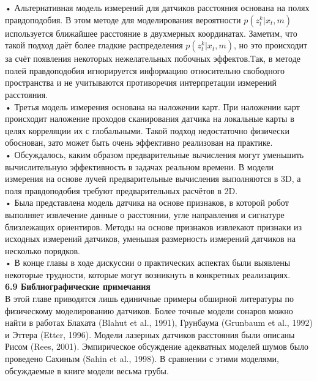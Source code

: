 \documentclass[10pt,a4paper]{article}
\begin{document}
• Альтернативная модель измерений для датчиков расстояния основана на полях правдоподобия. В этом методе для моделирования вероятности $p(z_t^k | x_t, m)$ используется ближайшее расстояние в двухмерных координатах. Заметим, что такой подход даёт более гладкие распределения $p(z_t^k | x_t, m)$, но это происходит за счёт появления некоторых нежелательных побочных эффектов.Так, в методе полей правдоподобия игнорируется информацию относительно свободного пространства и не учитываются противоречия интерпретации измерений расстояния.\\

• Третья модель измерения основана на наложении карт. При наложении карт происходит наложение проходов сканирования датчика на локальные карты в целях корреляции их с глобальными. Такой подход недостаточно физически обоснован, зато может быть очень эффективно реализован на практике. \\

• Обсуждалось, каким образом предварительные вычисления могут уменьшить вычислительную эффективность в задачах реальном времени. В модели измерения на основе лучей предварительные вычисления выполняются в 3D, а поля правдоподобия требуют предварительных расчётов в 2D.\\

• Была представлена модель датчика на основе признаков, в которой робот выполняет извлечение данные о расстоянии, угле направления и сигнатуре близлежащих ориентиров. Методы на основе признаков извлекают признаки из исходных измерений датчиков, уменьшая  размерность измерений датчиков на несколько порядков. \\

• В конце главы в ходе дискуссии о практических аспектах были выявлены некоторые трудности, которые могут возникнуть в конкретных реализациях. \\

\textbf{6.9 Библиографические примечания}\\

В этой главе приводятся лишь единичные примеры обширной литературы по физическому моделированию датчиков. Более точные модели сонаров можно найти в работах Блахата (Blahut et al., 1991), Грунбаума (Grunbaum et al., 1992) и Эттера (Etter, 1996). Модели лазерных датчиков расстояния были описаны Рисом (Rees, 2001). Эмпирическое обсуждение адекватных моделей шумов было проведено Сахиным (Sahin et al., 1998). В сравнении с этими моделями, обсуждаемые в книге модели весьма грубы.
\end{document}
